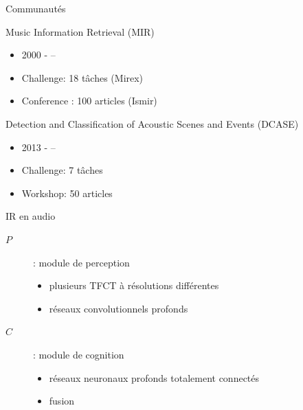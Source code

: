 \begin{frame}{Communautés}
\begin{block}{Music Information Retrieval (MIR)}
\begin{itemize}
\item 2000 - --
\item Challenge: 18 tâches  (Mirex)
\item Conference : 100 articles (Ismir)
\end{itemize}
\end{block}
\begin{block}{Detection and Classification of
Acoustic Scenes and Events (DCASE)}
\begin{itemize}
\item 2013 - --
\item Challenge: 7 tâches
\item Workshop: 50 articles
\end{itemize}
\end{block}
\end{frame}


\begin{frame}{IR en audio}
\begin{center}
\end{center}
\vspace{.8cm}
\begin{description}
\item[$P$]: module de \og perception \fg
\begin{itemize}
    \item plusieurs TFCT à résolutions différentes
    \item réseaux convolutionnels profonds
\end{itemize}
\item[$C$]: module de \og cognition \fg
\begin{itemize}
    \item réseaux neuronaux profonds totalement connectés
    \item fusion
\end{itemize}
\end{description}
\end{frame}

